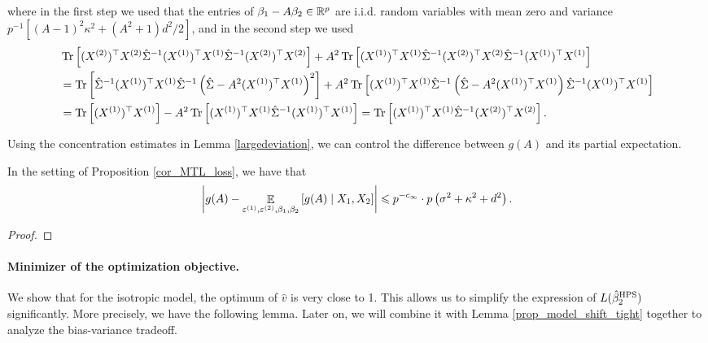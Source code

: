 where in the first step we used that the entries of $\beta_1-A\beta_2\in \mathbb{R}^p$ are i.i.d. random variables with mean zero and variance $p^{-1}[(A-1)^2\kappa^2 + (A^2+1)d^2/2]$, and in the second step we used  %
\begin{align*}
 &\operatorname{Tr}\left[  (X^{(2)})^\top X^{(2)} \hat \Sigma^{-1}(X^{(1)})^\top X^{(1)} \hat \Sigma^{-1} (X^{(2)})^\top X^{(2)}\right]+ A^2 \operatorname{Tr}\left[  (X^{(1)})^\top X^{(1)} \hat \Sigma^{-1}(X^{(2)})^\top X^{(2)} \hat \Sigma^{-1} (X^{(1)})^\top X^{(1)}\right] \\
 &=\operatorname{Tr}\left[  \hat \Sigma^{-1}(X^{(1)})^\top X^{(1)} \hat \Sigma^{-1} \left( \hat\Sigma- A^2 (X^{(1)})^\top X^{(1)} \right)^2\right]+ A^2 \operatorname{Tr}\left[  (X^{(1)})^\top X^{(1)} \hat \Sigma^{-1}\left( \hat\Sigma- A^2 (X^{(1)})^\top X^{(1)} \right) \hat \Sigma^{-1} (X^{(1)})^\top X^{(1)}\right] \\
 &=\operatorname{Tr}\left[  (X^{(1)})^\top X^{(1)}\right] - A^2\operatorname{Tr}\left[ (X^{(1)})^\top X^{(1)} \hat \Sigma^{-1}(X^{(1)})^\top X^{(1)}\right] = \operatorname{Tr}\left[ (X^{(1)})^\top X^{(1)} \hat \Sigma^{-1}(X^{(2)})^\top X^{(2)}\right] .
\end{align*}
 
Using the concentration estimates in Lemma \ref{largedeviation}, we can control the difference between $g(A)$ and its partial expectation. %
 \begin{claim}\label{claim_largedev1}
 In the setting of Proposition \ref{cor_MTL_loss}, we have that 
$$\left| g(A) - \mathop{\mathbb{E}}_{\varepsilon^{(1)}, \varepsilon^{(2)} ,\beta_1,\beta_2}\left[ g(A) \mid X_1, X_2  \right]\right| \leqslant p^{-c_\infty}\cdot p\left(\sigma^2 +\kappa^2+d^2 \right). $$
 \end{claim}
 \begin{proof}
 \end{proof}


 \paragraph{Minimizer of the optimization objective.} We show that for the isotropic model, the optimum of $\hat v$ is very close to 1.
This allows us to simplify the expression of $L(\hat{\beta}_2^{\textup{HPS}})$ significantly.
More precisely, we have the following lemma.
Later on, we will combine it with Lemma \ref{prop_model_shift_tight} together to analyze the bias-variance tradeoff.

